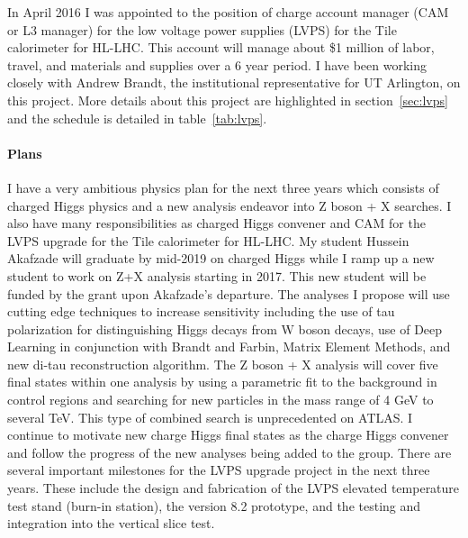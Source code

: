 In April 2016 I was appointed to the position of charge account manager (CAM or L3 manager) for the low voltage power supplies (LVPS) for the Tile calorimeter for HL-LHC.  This account will manage about \$1 million 
of labor, travel, and materials and supplies over a 6 year period.  
I have been working closely with Andrew Brandt, the institutional representative for UT Arlington, on this project.
More details about this project are highlighted in section~\ref{sec:lvps} and the schedule is detailed in table~\ref{tab:lvps}.
\paragraph{Plans}
I have a very ambitious physics plan for the next three years which consists of charged Higgs physics and a new analysis endeavor into Z boson + X searches.  I also have many responsibilities as
charged Higgs convener and CAM for the LVPS upgrade for the Tile calorimeter for HL-LHC.  My student Hussein Akafzade will graduate by mid-2019 on charged Higgs while I ramp up a new student to work on
Z+X analysis starting in 2017. This new student will be funded by the grant upon Akafzade's departure.  The analyses I propose will use cutting edge techniques to increase sensitivity including the use
of tau polarization for distinguishing Higgs decays from W boson decays, use of Deep Learning in conjunction with Brandt and Farbin, Matrix Element Methods, and new di-tau reconstruction algorithm.  
The Z boson + X analysis will cover five final states within one analysis by using a parametric fit to the background in control regions and searching for new particles in the mass range of 4 GeV to several TeV.  This type of combined
search is unprecedented on ATLAS.
I continue to motivate new charge Higgs final states as the charge Higgs convener and follow the progress of the new analyses being added to the group. There are several important milestones for the LVPS upgrade project
in the next three years.  These include the design and fabrication of the LVPS elevated temperature test stand (burn-in station), the version 8.2 prototype, and the testing and integration into the vertical 
slice test.
